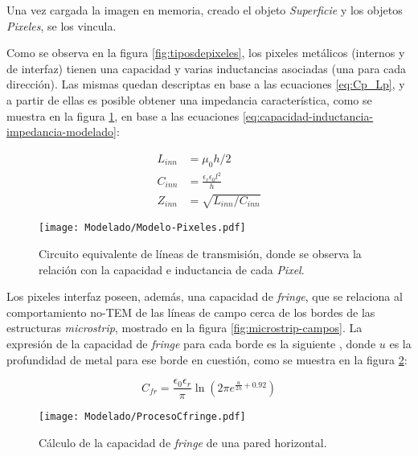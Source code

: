 Una vez cargada la imagen en memoria, creado el objeto \textit{Superficie} y los objetos \textit{Pixeles}, se los vincula.

Como se observa en la figura \ref{fig:tiposdepixeles}, los pixeles metálicos (internos y de interfaz) tienen una capacidad y varias inductancias asociadas (una para cada dirección). Las mismas quedan descriptas en base a las ecuaciones \ref{eq:Cp_Lp}, y a partir de ellas es posible obtener una impedancia característica, como se muestra en la figura \ref{fig:modelo-con-lineas-de-transmision}, en base a las ecuaciones \ref{eq:capacidad-inductancia-impedancia-modelado}:

\begin{subequations}
	\label{eq:capacidad-inductancia-impedancia-modelado}
	\begin{align}
		L_{inn} &= \mu_0 h /2 \\
		C_{inn} &= \frac{\epsilon_r \epsilon_0 l^2}{h} \\
		Z_{inn} &= \sqrt{L_{inn} / C_{inn}}
	\end{align}
\end{subequations}

\begin{figure}[h]
	\centering
	\texttt{[image: Modelado/Modelo-Pixeles.pdf]}
	\caption{Circuito equivalente de líneas de transmisión, donde se observa la relación con la capacidad e inductancia de cada \textit{Pixel}.}
	\label{fig:modelo-con-lineas-de-transmision}
\end{figure}

Los pixeles interfaz poseen, además, una capacidad de \textit{fringe}, que se relaciona al comportamiento no-TEM de las líneas de campo cerca de los bordes de las estructuras \textit{microstrip}, mostrado en la figura \ref{fig:microstrip-campos}. La expresión de la capacidad de \textit{fringe} para cada borde es la siguiente \cite{ThummWiesbeck:CharacteristicImpedance}, donde $u$ es la profundidad de metal para ese borde en cuestión, como se muestra en la figura \ref{fig:profundidad-para-cfringe}:

\begin{equation}
	C_{fr} = \frac{\epsilon_0 \epsilon_r} {\pi} \ln (2 \pi e^{\frac{u}{2 h} + 0.92})
\end{equation}

\begin{figure}[h]
	\centering
	\texttt{[image: Modelado/ProcesoCfringe.pdf]}
	\caption{Cálculo de la capacidad de \textit{fringe} de una pared horizontal.}
	\label{fig:profundidad-para-cfringe}
\end{figure}

